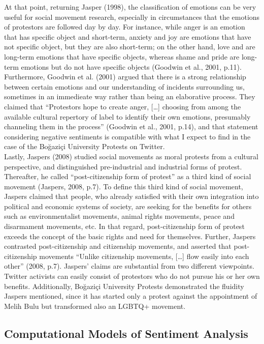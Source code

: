 \documentclass[a4paper]{article}
\begin{document}
At that point, returning Jasper (1998), the classification of emotions can be very useful for social movement research, especially in circumstances that the emotions of protestors are followed day by day. For instance, while anger is an emotion that has specific object and short-term, anxiety and joy are emotions that have not specific object, but they are also short-term; on the other hand, love and are long-term emotions that have specific objects, whereas shame and pride are long-term emotions but do not have specific objects (Goodwin et al., 2001, p.11). Furthermore, Goodwin et al. (2001) argued that there is a strong relationship between certain emotions and our understanding of incidents surrounding us, sometimes in an immedieate way rather than being an elaborative process. They claimed that “Protestors hope to create anger, […] choosing from among the available cultural repertory of label to identify their own emotions, presumably channeling them in the process” (Goodwin et al., 2001, p.14), and that statement considering negative sentiments is compatible with what I expect to find in the case of the Boğaziçi University Protests on Twitter. \\
	
Lastly, Jaspers (2008) studied social movements as moral protests from a cultural perspective, and distinguished pre-industrial and industrial forms of protest. Thereafter, he called “post-citizenship form of protest” as a third kind of social movement (Jaspers, 2008, p.7). To define this third kind of social movement, Jaspers claimed that people, who already satisfied with their own integration into political and economic systems of society, are seeking for the benefits for others such as environmentalist movements, animal rights movements, peace and disarmament movements, etc. In that regard, post-citizenship form of protest exceeds the concept of the basic rights and need for themselves. Further, Jaspers contrasted post-citizenship and citizenship movements, and asserted that post-citizenship movements “Unlike citizenship movements, […] flow easily into each other” (2008, p.7). Jaspers’ claims are substantial from two different viewpoints. Twitter activists can easily consist of protestors who do not pursue his or her own benefits. Additionally, Boğaziçi University Protests demonstrated the fluidity Jaspers mentioned, since it has started only a protest against the appointment of Melih Bulu but transformed also an LGBTQ+ movement. 
	
\subsection*{Computational Models of Sentiment Analysis}
\end{document}
